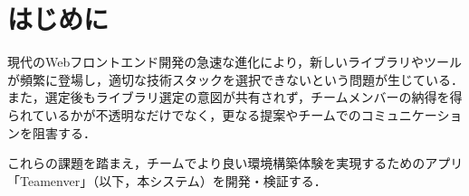 \documentclass[main]{subfiles}
\begin{document}
\section{はじめに }
現代のWebフロントエンド開発の急速な進化により，新しいライブラリやツールが頻繁に登場し，適切な技術スタックを選択できないという問題が生じている\cite{medium.com}．
また，選定後もライブラリ選定の意図が共有されず，チームメンバーの納得を得られているかが不透明なだけでなく，更なる提案やチームでのコミュニケーションを阻害する．

これらの課題を踏まえ，チームでより良い環境構築体験を実現するためのアプリ「Teamenver」（以下，本システム）を開発・検証する．
\end{document}

